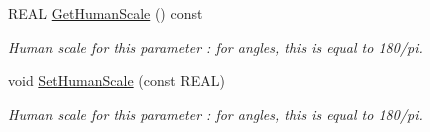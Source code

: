 \begin{Indent}
\begin{DoxyCompactItemize}
R\+E\+AL \mbox{\hyperlink{class_obj_cryst_1_1_refinable_par_a4628611ff72459dd5f525ac5a8571447}{Get\+Human\+Scale}} () const
\begin{DoxyCompactList}\small\item\em Human scale for this parameter \+: for angles, this is equal to 180/pi. \end{DoxyCompactList}\item 
\mbox{\label{class_obj_cryst_1_1_refinable_par_a05a23549ca32b4745dee0a1bb539830e}} 
void \mbox{\hyperlink{class_obj_cryst_1_1_refinable_par_a05a23549ca32b4745dee0a1bb539830e}{Set\+Human\+Scale}} (const R\+E\+AL)
\begin{DoxyCompactList}\small\item\em Human scale for this parameter \+: for angles, this is equal to 180/pi. \end{DoxyCompactList}\end{DoxyCompactItemize}
\end{Indent}
